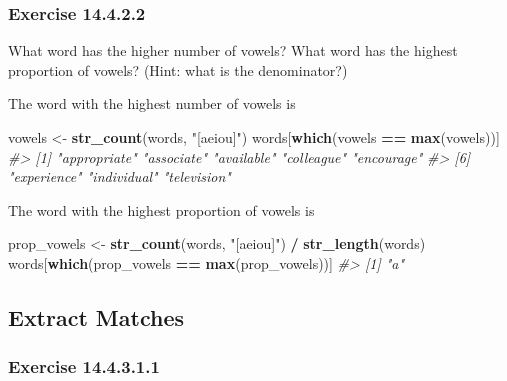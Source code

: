 \documentclass[]{book}
\newenvironment{Shaded}{\begin{snugshade}}{\end{snugshade}}
\newcommand{\CommentTok}[1]{\textcolor[rgb]{0.56,0.35,0.01}{\textit{#1}}}
\newcommand{\KeywordTok}[1]{\textcolor[rgb]{0.13,0.29,0.53}{\textbf{#1}}}
\newcommand{\NormalTok}[1]{#1}
\newcommand{\OperatorTok}[1]{\textcolor[rgb]{0.81,0.36,0.00}{\textbf{#1}}}
\newcommand{\StringTok}[1]{\textcolor[rgb]{0.31,0.60,0.02}{#1}}
\theoremstyle{plain}
\theoremstyle{remark}
\begin{document}
\hypertarget{exercise-14.4.2.2}{%
\subsubsection*{\texorpdfstring{Exercise
{14.4.2.2}}{Exercise 14.4.2.2}}\label{exercise-14.4.2.2}}

What word has the higher number of vowels? What word has the highest
proportion of vowels? (Hint: what is the denominator?)

The word with the highest number of vowels is

\begin{Shaded}
\begin{Highlighting}[]
\NormalTok{vowels <-}\StringTok{ }\KeywordTok{str_count}\NormalTok{(words, }\StringTok{"[aeiou]"}\NormalTok{)}
\NormalTok{words[}\KeywordTok{which}\NormalTok{(vowels }\OperatorTok{==}\StringTok{ }\KeywordTok{max}\NormalTok{(vowels))]}
\CommentTok{#> [1] "appropriate" "associate"   "available"   "colleague"   "encourage"  }
\CommentTok{#> [6] "experience"  "individual"  "television"}
\end{Highlighting}
\end{Shaded}

The word with the highest proportion of vowels is

\begin{Shaded}
\begin{Highlighting}[]
\NormalTok{prop_vowels <-}\StringTok{ }\KeywordTok{str_count}\NormalTok{(words, }\StringTok{"[aeiou]"}\NormalTok{) }\OperatorTok{/}\StringTok{ }\KeywordTok{str_length}\NormalTok{(words)}
\NormalTok{words[}\KeywordTok{which}\NormalTok{(prop_vowels }\OperatorTok{==}\StringTok{ }\KeywordTok{max}\NormalTok{(prop_vowels))]}
\CommentTok{#> [1] "a"}
\end{Highlighting}
\end{Shaded}

\hypertarget{extract-matches}{%
\subsection{Extract Matches}\label{extract-matches}}

\hypertarget{exercise-14.4.3.1.1}{%
\subsubsection*{\texorpdfstring{Exercise
{14.4.3.1.1}}{Exercise 14.4.3.1.1}}\label{exercise-14.4.3.1.1}}
\end{document}

